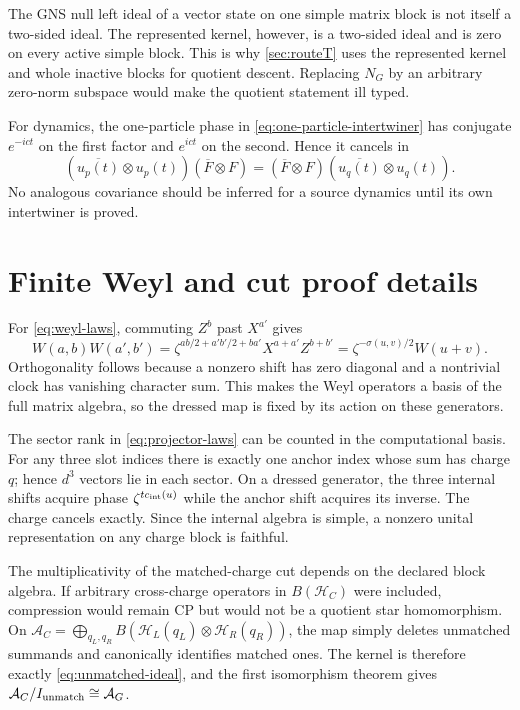 \documentclass[11pt,a4paper]{article}
\theoremstyle{definition}
\theoremstyle{remark}
\newcommand{\A}{\mathcal A}
\newcommand{\Hh}{\mathcal H}
\begin{document}
The GNS null left ideal of a vector state on one simple matrix block is not itself a
two-sided ideal.  The represented kernel, however, is a two-sided ideal and is zero on
every active simple block.  This is why \cref{sec:routeT} uses the represented kernel
and whole inactive blocks for quotient descent.  Replacing $N_G$ by an arbitrary
zero-norm subspace would make the quotient statement ill typed.

For dynamics, the one-particle phase in
\eqref{eq:one-particle-intertwiner} has conjugate $e^{-ic t}$ on the first factor and
$e^{ic t}$ on the second.  Hence it cancels in
\begin{equation}
 (\overline{u_p(t)}\otimes u_p(t))
 (\overline F\otimes F)
 =(\overline F\otimes F)
 (\overline{u_q(t)}\otimes u_q(t)).
\end{equation}
No analogous covariance should be inferred for a source dynamics until its own
intertwiner is proved.

\section{Finite Weyl and cut proof details}

For \eqref{eq:weyl-laws}, commuting $Z^b$ past $X^{a'}$ gives
\begin{equation}
 W(a,b)W(a',b')
 =\zeta^{ab/2+a'b'/2+ba'}X^{a+a'}Z^{b+b'}
 =\zeta^{-\sigma(u,v)/2}W(u+v).
\end{equation}
Orthogonality follows because a nonzero shift has zero diagonal and a nontrivial clock
has vanishing character sum.  This makes the Weyl operators a basis of the full matrix
algebra, so the dressed map is fixed by its action on these generators.

The sector rank in \eqref{eq:projector-laws} can be counted in the computational basis.
For any three slot indices there is exactly one anchor index whose sum has charge $q$;
hence $d^3$ vectors lie in each sector.  On a dressed generator, the three internal
shifts acquire phase $\zeta^{t c_{\rm int}(u)}$ while the anchor shift acquires its
inverse.  The charge cancels exactly.  Since the internal algebra is simple, a nonzero
unital representation on any charge block is faithful.

The multiplicativity of the matched-charge cut depends on the declared block algebra.  If arbitrary
cross-charge operators in $B(\Hh_C)$ were included, compression would remain CP but
would not be a quotient star homomorphism.  On
$\A_C=\bigoplus_{q_L,q_R}B(\Hh_L(q_L)\otimes\Hh_R(q_R))$, the map simply deletes
unmatched summands and canonically identifies matched ones.  The kernel is therefore
exactly \eqref{eq:unmatched-ideal}, and the first isomorphism theorem gives
$\A_C/I_{\rm unmatch}\cong\A_G$.
\end{document}
